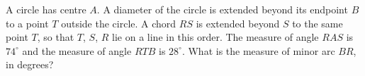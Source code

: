 A circle has centre $A$. A diameter of the circle is extended beyond its endpoint $B$ to a point $T$ outside the circle. A chord $RS$ is extended beyond $S$ to the same point $T$, so that $T$, $S$, $R$ lie on a line in this order. The measure of angle $RAS$ is $74^\circ$ and the measure of angle $RTB$ is $28^\circ$. What is the measure of minor arc $BR$, in degrees?
